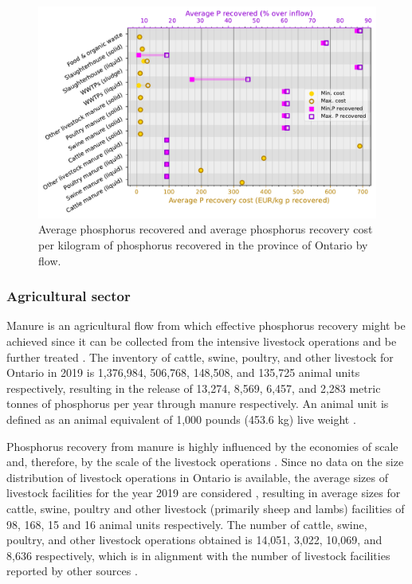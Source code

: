 \documentclass[]{elsarticle}
\begin{document}
\begin{figure}[H]
	\centering
	\includegraphics[width=0.85\linewidth, trim={0cm 0cm 0cm 0cm},clip]{Figures/Results_PlotSummarySpecific.pdf} 
	\caption{Average phosphorus recovered and average phosphorus recovery cost per kilogram of phosphorus recovered in the province of Ontario by flow.}
	\label{fig:Results_PlotSummarySpecific}
\end{figure}

\subsubsection{Agricultural sector}
Manure is an agricultural flow from which effective phosphorus recovery might be achieved since it can be collected from the intensive livestock operations and be further treated \citep{schoumans2010phosphorus}. The inventory of cattle, swine, poultry, and other livestock for Ontario in 2019 is 1,376,984, 506,768, 148,508, and 135,725 animal units respectively, resulting in the release of 13,274, 8,569, 6,457, and 2,283 metric tonnes of phosphorus per year through manure respectively. An animal unit is defined as an animal equivalent of 1,000 pounds (453.6 kg) live weight \citep{animal_unit_definition}.

Phosphorus recovery from manure is highly influenced by the economies of scale and, therefore, by the scale of the livestock operations \citep{martin2021geospatial}. Since no data on the size distribution of livestock operations in Ontario is available, the average sizes of livestock facilities for the year 2019 are considered \citep{CAFOSAvgSize}, resulting in average sizes for cattle, swine, poultry and other livestock (primarily sheep and lambs) facilities of 98, 168, 15 and 16 animal units respectively. The number of cattle, swine, poultry, and other livestock operations obtained is 14,051, 3,022, 10,069, and 8,636 respectively, which is in alignment with the number of livestock facilities reported by other sources \citep{CAFOSAvgSizeAndNumber}.
\end{document}
